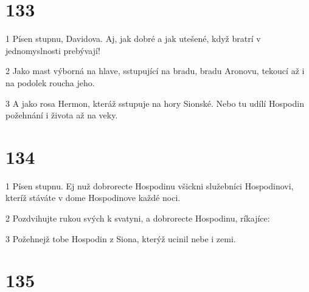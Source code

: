 \chapter{133}

\par 1 Písen stupnu, Davidova. Aj, jak dobré a jak utešené, když bratrí v jednomyslnosti prebývají!
\par 2 Jako mast výborná na hlave, sstupující na bradu, bradu Aronovu, tekoucí až i na podolek roucha jeho.
\par 3 A jako rosa Hermon, kteráž sstupuje na hory Sionské. Nebo tu udílí Hospodin požehnání i života až na veky.

\chapter{134}

\par 1 Písen stupnu. Ej nuž dobrorecte Hospodinu všickni služebníci Hospodinovi, kteríž stáváte v dome Hospodinove každé noci.
\par 2 Pozdvihujte rukou svých k svatyni, a dobrorecte Hospodinu, ríkajíce:
\par 3 Požehnejž tobe Hospodin z Siona, kterýž ucinil nebe i zemi.

\chapter{135}

